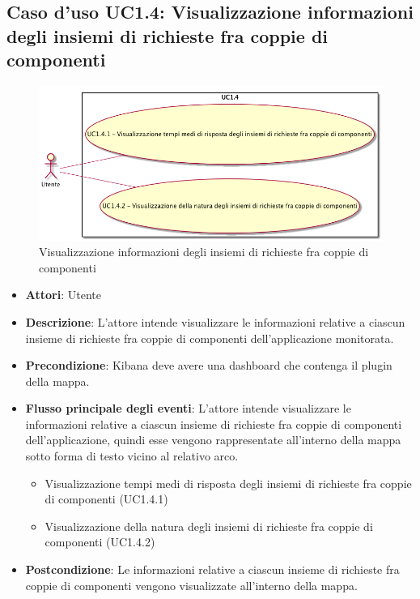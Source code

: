 \subsection{Caso d'uso UC1.4: Visualizzazione informazioni degli insiemi di richieste fra coppie di componenti}
\begin{figure} [H]
	\centering
	\includegraphics[scale=0.45]{./UC/UC1-4.png}
	\caption{Visualizzazione informazioni degli insiemi di richieste fra coppie di componenti}\label{}
\end{figure}
\begin{itemize}
	\item \textbf{Attori}: Utente
	\item \textbf{Descrizione}: L'attore intende visualizzare le informazioni relative a ciascun insieme di richieste fra coppie di componenti dell'applicazione monitorata.
	\item \textbf{Precondizione}: Kibana deve avere una dashboard che contenga il plugin della mappa.
	\item \textbf{Flusso principale degli eventi}: L'attore intende visualizzare le informazioni relative a ciascun insieme di richieste fra coppie di componenti dell'applicazione, quindi esse vengono rappresentate all'interno della mappa sotto forma di testo vicino al relativo arco.
	\begin{itemize}
		\item Visualizzazione tempi medi di risposta degli insiemi di richieste fra coppie di componenti (UC1.4.1)
		\item Visualizzazione della natura degli insiemi di richieste fra coppie di componenti (UC1.4.2)
	\end{itemize}
	\item \textbf{Postcondizione}: Le informazioni relative a ciascun insieme di richieste fra coppie di componenti vengono visualizzate all'interno della mappa.
\end{itemize}
